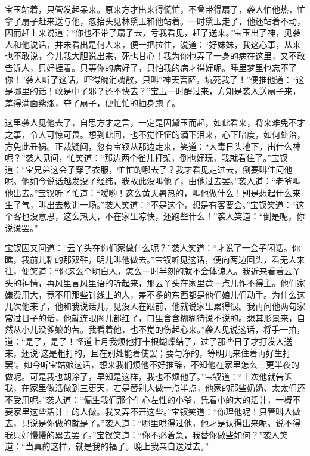 \documentclass[12pt,oneside]{book}
\begin{document}
宝玉站着，只管发起呆来。原来方才出来得慌忙，不曾带得扇子，袭人怕他热，忙拿了扇子赶来送与他，忽抬头见林黛玉和他站着。一时黛玉走了，他还站着不动，因而赶上来说道：“你也不带了扇子去，亏我看见，赶了送来。”宝玉出了神，见袭人和他说话，并未看出是何人来，便一把拉住，说道：“好妹妹，我这心事，从来也不敢说，今儿我大胆说出来，死也甘心！我为你也弄了一身的病在这里，又不敢告诉人，只好捱着。只等你的病好了，只怕我的病才得好呢。睡里梦里也忘不了你！”袭人听了这话，吓得魄消魂散，只叫“神天菩萨，坑死我了！”便推他道：“这是哪里的话！敢是中了邪？还不快去？”宝玉一时醒过来，方知是袭人送扇子来，羞得满面紫涨，夺了扇子，便忙忙的抽身跑了。

这里袭人见他去了，自思方才之言，一定是因黛玉而起，如此看来，将来难免不才之事，令人可惊可畏。想到此间，也不觉怔怔的滴下泪来，心下暗度，如何处治，方免此丑祸。正裁疑间，忽有宝钗从那边走来，笑道：“大毒日头地下，出什么神呢？”袭人见问，忙笑道：“那边两个雀儿打架，倒也好玩，我就看住了。”宝钗道：“宝兄弟这会子穿了衣服，忙忙的哪去了？我才看见走过去，倒要叫住问他呢。他如今说话越发没了经纬，我故此没叫他了，由他过去罢。”袭人道：“老爷叫他出去。”宝钗听了忙道：“嗳哟！这么黄天暑热的，叫他做什么！别是想起什么来生了气，叫出去教训一场。”袭人笑道：“不是这个，想是有客要会。”宝钗笑道：“这个客也没意思，这么热天，不在家里凉快，还跑些什么！”袭人笑道：“倒是呢，你说说罢。”

宝钗因又问道：“云丫头在你们家做什么呢？”袭人笑道：“才说了一会子闲话。你瞧，我前儿粘的那双鞋，明儿叫他做去。”宝钗听见这话，便向两边回头，看无人来往，便笑道：“你这么个明白人，怎么一时半刻的就不会体谅人。我近来看着云丫头的神情，再风里言风里语的听起来，那云丫头在家里竟一点儿作不得主。他们家嫌费用大，竟不用那些针线上的人，差不多的东西都是他们娘儿们动手。为什么这几次他来了，他和我说话儿，见没人在跟前，他就说家里累得很。我再问他两句家常过日子的话，他就连眼圈儿都红了，口里含含糊糊待说不说的。想其形景来，自然从小儿没爹娘的苦。我看着他，也不觉的伤起心来。”袭人见说这话，将手一拍，道：“是了，是了！怪道上月我烦他打十根蝴蝶结子，过了那些日子才打发人送来，还说‘这是粗打的，且在别处能着使罢；要匀净的，等明儿来住着再好生打罢’。如今听宝姑娘这话，想来我们烦他不好推辞，不知他在家里怎么三更半夜的做呢。可是我也胡涂了，早知是这样，我也不烦他了。”宝钗道：“上次他就告诉我，在家里做活做到三更天，若是替别人做一点半点，他家的那些奶奶、太太们还不受用呢。”袭人道：“偏生我们那个牛心左性的小爷，凭着小的大的活计，一概不要家里这些活计上的人做。我又弄不开这些。”宝钗笑道：“你理他呢！只管叫人做去，只说是你做的就是了。”袭人道：“哪里哄得过他，他才是认得出来呢。说不得我只好慢慢的累去罢了。”宝钗笑道：“你不必着急，我替你做些如何？”袭人笑道：“当真的这样，就是我的福了。晚上我亲自送过去。”
\end{document}
